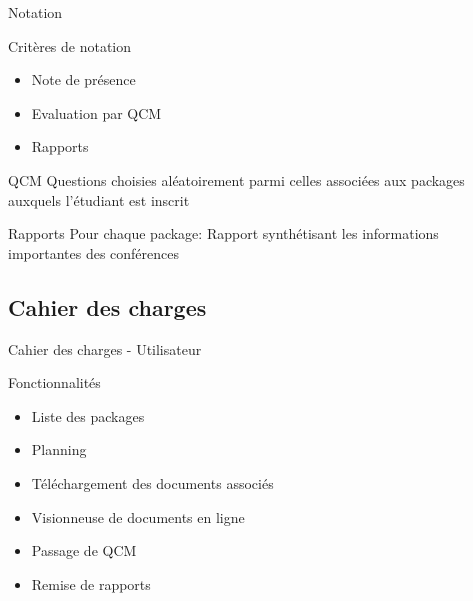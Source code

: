 \begin{frame}{Notation}
    \begin{block}{Critères de notation}
    \begin{itemize}
    \item Note de présence
    \item Evaluation par QCM
    \item Rapports
    \end{itemize}
    \end{block}

    \begin{block}{QCM}
    Questions choisies aléatoirement parmi celles associées aux packages auxquels l'étudiant est inscrit
    \end{block}

    \begin{block}{Rapports}
    Pour chaque package: Rapport synthétisant les informations importantes des conférences
    \end{block}
\end{frame}

\subsection{Cahier des charges}
\begin{frame}{Cahier des charges - Utilisateur}
    \begin{block}{Fonctionnalités}
    \begin{itemize}
    \item Liste des packages
    \item Planning
    \item Téléchargement des documents associés
    \item Visionneuse de documents en ligne
    \item Passage de QCM
    \item Remise de rapports
    \end{itemize}
    \end{block}
\end{frame}

